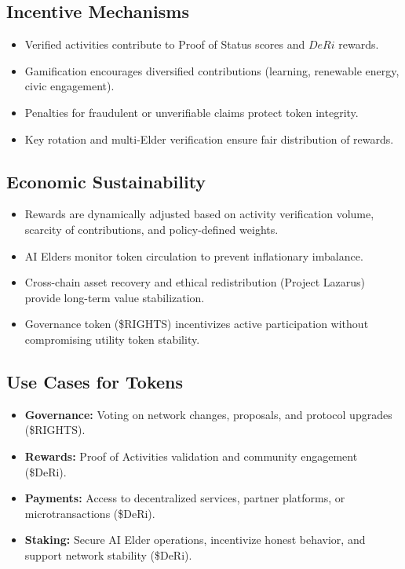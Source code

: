 \documentclass[11pt,a4paper]{article}
\begin{document}
\subsection{Incentive Mechanisms}
\begin{itemize}
    \item Verified activities contribute to Proof of Status scores and $DeRi$ rewards.  
    \item Gamification encourages diversified contributions (learning, renewable energy, civic engagement).  
    \item Penalties for fraudulent or unverifiable claims protect token integrity.  
    \item Key rotation and multi-Elder verification ensure fair distribution of rewards.  
\end{itemize}

\subsection{Economic Sustainability}
\begin{itemize}
    \item Rewards are dynamically adjusted based on activity verification volume, scarcity of contributions, and policy-defined weights.  
    \item AI Elders monitor token circulation to prevent inflationary imbalance.  
    \item Cross-chain asset recovery and ethical redistribution (Project Lazarus) provide long-term value stabilization.  
    \item Governance token (\$RIGHTS) incentivizes active participation without compromising utility token stability.  
\end{itemize}

\subsection{Use Cases for Tokens}
\begin{itemize}
    \item \textbf{Governance:} Voting on network changes, proposals, and protocol upgrades (\$RIGHTS).  
    \item \textbf{Rewards:} Proof of Activities validation and community engagement (\$DeRi).  
    \item \textbf{Payments:} Access to decentralized services, partner platforms, or microtransactions (\$DeRi).  
    \item \textbf{Staking:} Secure AI Elder operations, incentivize honest behavior, and support network stability (\$DeRi).  
\end{itemize}
\end{document}
